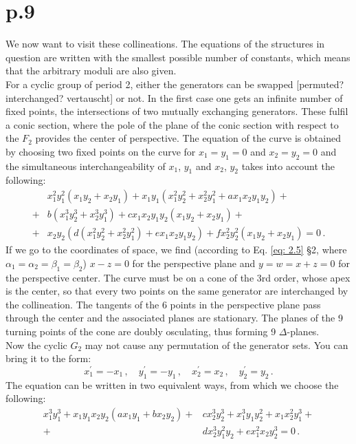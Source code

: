 \documentclass[leqno]{article}
\begin{document}
\section{p.9}
We now want to visit these collineations. The equations of the structures in question are written with the smallest possible number of constants, which means that the arbitrary moduli are also given. \\
For a cyclic group of period 2, either the generators can be swapped [permuted? interchanged? vertauscht] or not. In the first case one gets an infinite number of fixed points, the intersections of two mutually exchanging generators. These fulfil a conic section, where the pole of the plane of the conic section with respect to the $F_2$ provides the center of perspective. The equation of the curve is obtained by choosing two fixed points on the curve for $x_1 = y_1 = 0$ and $x_2 = y_2 = 0$ and the simultaneous interchangeability of $x_1$, $y_1$ and $x_2 $, $y_2$ takes into account the following:
\begin{align}\label{eq: 3.1}
 & x_1^2 y_1^2 (x_1 y_2 + x_2 y_1) + x_1 y_1(x_1^2 y_2^2 + x_2^2 y_1^2 + a x_1 x_2 y_1 y_2) + \nonumber \\
 +& b(x_1^3 y_2^3 + x_2^3 y_1^3) + c x_1 x_2 y_1 y_2 (x_1 y_2 + x_2 y_1) +  \tag{1}\\
 +& x_2 y_2 (d(x_1^2 y_2^2 + x_2^2 y_1^2) + ex_1 x_2 y_1 y_2) + f x_2^2 y_2^2  (x_1 y_2 + x_2 y_1) =0 \, . \nonumber
\end{align}
If we go to the coordinates of space, we find (according to Eq. \eqref{eq: 2.5} \S 2, where $\alpha_1 = \alpha_2 = \beta_1 = \beta_2$) $x-z=0$ for the perspective plane  and $y=w=x+z=0$ for the perspective center. The curve must be on a cone of the 3rd order, whose apex is the center, so that every two points on the same generator are interchanged by the collineation. The tangents of the 6 points in the perspective plane pass through the center and the associated planes are stationary. The planes of the 9 turning points of the cone are doubly osculating, thus forming 9 $\Delta$-planes. \\
Now the cyclic $G_2$ may not cause any permutation of the generator sets. You can bring it to the form:
\[
x_1^\prime = -x_1 \, , \quad y_1^\prime = - y_1 \, , \quad x_2^\prime = x_2 \, , \quad y_2^\prime = y_2 \, .   
\]
The equation can be written in two equivalent ways, from which we choose the following:
\begin{align}\label{eq: 3.2}
	x_1^3 y_1^3 + x_1 y_1 x_2 y_2 (ax_1 y_1 + b x_2 y_2) +& c x_2^3 y_2^3 +x_1^3 y_1 y_2^2 + x_1 x_2^2 y_1^3 + \tag{2} \\ 
	+& d x_2^3 y_1^2 y_2 + e x_1^2 x_2 y_2^3 = 0 \, .  \nonumber 
\end{align}
\end{document}
